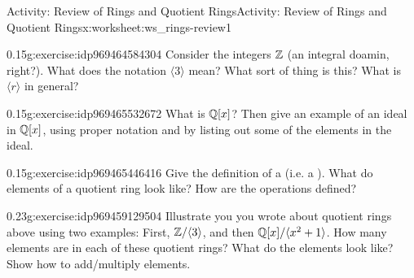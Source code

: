 \documentclass[11pt]{book}
\begin{document}
\begin{worksheet-subsection}{Activity: Review of Rings and Quotient Rings}{}{Activity: Review of Rings and Quotient Rings}{}{}{x:worksheet:ws_rings-review1}
\begin{divisionexercise}{6}{}{0.15}{g:exercise:idp969464584304}
Consider the integers \(\mathbb{Z}\) (an integral doamin, right?).  What does the notation \(\langle 3 \rangle\) mean?  What sort of thing is this?  What is \(\langle r \rangle\) in general?%
\end{divisionexercise}%
\begin{divisionexercise}{7}{}{0.15}{g:exercise:idp969465532672}%
What is \(\mathbb{Q}[x]\)?  Then give an example of an ideal in \(\mathbb{Q}[x]\), using proper notation and by listing out some of the elements in the ideal.%
\end{divisionexercise}%
\begin{divisionexercise}{8}{}{0.15}{g:exercise:idp969465446416}%
Give the definition of a  (i.e. a ).  What do elements of a quotient ring look like?  How are the operations defined?%
\end{divisionexercise}%
\begin{divisionexercise}{9}{}{0.23}{g:exercise:idp969459129504}%
Illustrate you you wrote about quotient rings above using two examples: First, \(\mathbb{Z}/\langle 3 \rangle\), and then \(\mathbb{Q}[x]/\langle x^2 + 1\rangle\).  How many elements are in each of these quotient rings?  What do the elements look like?  Show how to add\slash{}multiply elements.%
\end{divisionexercise}%
\end{worksheet-subsection}
\restoregeometry
\end{document}
